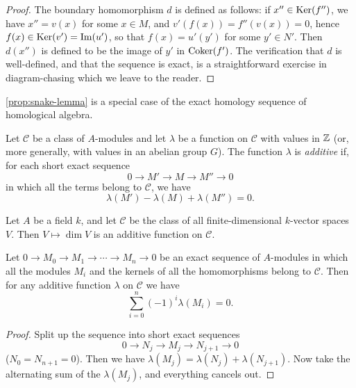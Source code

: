 \begin{proof}
    The boundary homomorphism $d$ is defined as follows: if $x'' \in \operatorname{Ker}(f'')$, we have $x'' = v(x)$ for some $x \in M$, and $v'(f(x)) = f''(v(x)) = 0$, hence $f(x) \in \operatorname{Ker}(v') = \operatorname{Im}(u')$, so that $f(x) = u'(y')$ for some $y' \in N'$. Then $d(x'')$ is defined to be the image of $y'$ in $\operatorname{Coker}(f')$. The verification that $d$ is well-defined, and that the sequence is exact, is a straightforward exercise in diagram-chasing which we leave to the reader.
\end{proof}

\begin{remark}
    \eqref{prop:snake-lemma} is a special case of the exact homology sequence of homological algebra.
\end{remark}

Let $\mathcal{C}$ be a class of $A$-modules and let $\lambda$ be a function on $\mathcal{C}$ with values in $\mathbb{Z}$ (or, more generally, with values in an abelian group $G$). The function $\lambda$ is \emph{additive} if, for each short exact sequence
\[
    0 \longrightarrow M' \longrightarrow M \longrightarrow M'' \longrightarrow 0
\]
in which all the terms belong to $\mathcal{C}$, we have
\[
    \lambda(M') - \lambda(M) + \lambda(M'') = 0.
\]

\begin{example}
Let $A$ be a field $k$, and let $\mathcal{C}$ be the class of all finite-dimensional $k$-vector spaces $V$. Then $V \mapsto \dim V$ is an additive function on $\mathcal{C}$.
\end{example}

\begin{proposition}\label{prop:additive-function}
Let $0 \longrightarrow M_0 \longrightarrow M_1 \longrightarrow \cdots \longrightarrow M_n \longrightarrow 0$ be an exact sequence of $A$-modules in which all the modules $M_i$ and the kernels of all the homomorphisms belong to $\mathcal{C}$. Then for any additive function $\lambda$ on $\mathcal{C}$ we have
\[
    \sum_{i=0}^n (-1)^i \lambda(M_i) = 0.
\]
\end{proposition}

\begin{proof}
Split up the sequence into short exact sequences
\[
    0 \longrightarrow N_j \longrightarrow M_j \longrightarrow N_{j+1} \longrightarrow 0
\]
($N_0 = N_{n+1} = 0$). Then we have $\lambda(M_j) = \lambda(N_j) + \lambda(N_{j+1})$. Now take the alternating sum of the $\lambda(M_j)$, and everything cancels out.
\end{proof}

